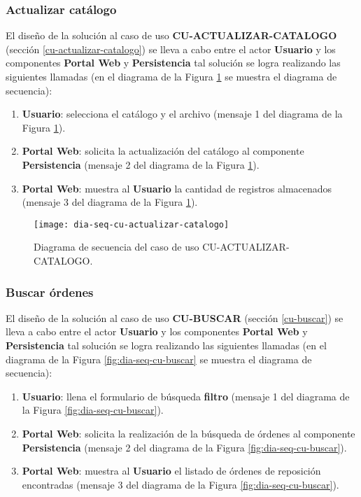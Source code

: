 \subsubsection{Actualizar catálogo}
El diseño de la solución al caso de uso \textbf{CU-ACTUALIZAR-CATALOGO} (sección \ref{cu-actualizar-catalogo}) se lleva a cabo entre el actor \textbf{Usuario} y los componentes \textbf{Portal Web} y \textbf{Persistencia} tal solución se logra realizando las siguientes llamadas (en el diagrama de la Figura \ref{fig:dia-seq-cu-actualizar-catalogo} se muestra el diagrama de secuencia):
\begin{enumerate}
	\item \textbf{Usuario}: selecciona el catálogo y el archivo (mensaje 1 del diagrama de la Figura \ref{fig:dia-seq-cu-actualizar-catalogo}).
	\item \textbf{Portal Web}: solicita la actualización del catálogo al componente \textbf{Persistencia} (mensaje 2 del diagrama de la Figura \ref{fig:dia-seq-cu-actualizar-catalogo}).
	\item \textbf{Portal Web}: muestra al \textbf{Usuario} la cantidad de registros almacenados (mensaje 3 del diagrama de la Figura \ref{fig:dia-seq-cu-actualizar-catalogo}).
\end{enumerate}

\begin{figure}[h]
	\centering
	\texttt{[image: dia-seq-cu-actualizar-catalogo]}
	\caption{Diagrama de secuencia del caso de uso CU-ACTUALIZAR-CATALOGO.}
	\label{fig:dia-seq-cu-actualizar-catalogo}
\end{figure}

\subsubsection{Buscar órdenes}
El diseño de la solución al caso de uso \textbf{CU-BUSCAR} (sección \ref{cu-buscar}) se lleva a cabo entre el actor \textbf{Usuario} y los componentes \textbf{Portal Web} y \textbf{Persistencia} tal solución se logra realizando las siguientes llamadas (en el diagrama de la Figura \ref{fig:dia-seq-cu-buscar} se muestra el diagrama de secuencia):
\begin{enumerate}
	\item \textbf{Usuario}: llena el formulario de búsqueda \textbf{filtro} (mensaje 1 del diagrama de la Figura \ref{fig:dia-seq-cu-buscar}).
	\item \textbf{Portal Web}: solicita la realización de la búsqueda de órdenes al componente \textbf{Persistencia} (mensaje 2 del diagrama de la Figura \ref{fig:dia-seq-cu-buscar}).
	\item \textbf{Portal Web}: muestra al \textbf{Usuario} el listado de órdenes de reposición encontradas (mensaje 3 del diagrama de la Figura \ref{fig:dia-seq-cu-buscar}).
\end{enumerate}

